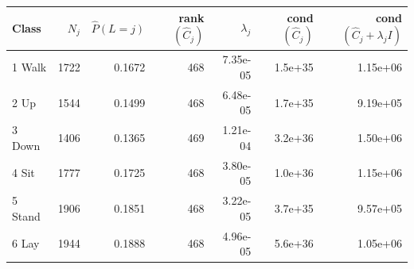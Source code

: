 \begin{tabular}{lrrrrrr}
\toprule
Class & $N_j$ & $\hat P(L{=}j)$ & rank$(\hat C_j)$ & $\lambda_j$ & cond$(\hat C_j)$ & cond$(\hat C_j+\lambda_j I)$ \\
\midrule
1 Walk & 1722 & 0.1672 & 468 & 7.35e-05 & 1.5e+35 & 1.15e+06 \\
2 Up & 1544 & 0.1499 & 468 & 6.48e-05 & 1.7e+35 & 9.19e+05 \\
3 Down & 1406 & 0.1365 & 469 & 1.21e-04 & 3.2e+36 & 1.50e+06 \\
4 Sit & 1777 & 0.1725 & 468 & 3.80e-05 & 1.0e+36 & 1.15e+06 \\
5 Stand & 1906 & 0.1851 & 468 & 3.22e-05 & 3.7e+35 & 9.57e+05 \\
6 Lay & 1944 & 0.1888 & 468 & 4.96e-05 & 5.6e+36 & 1.05e+06 \\
\bottomrule
\end{tabular}
